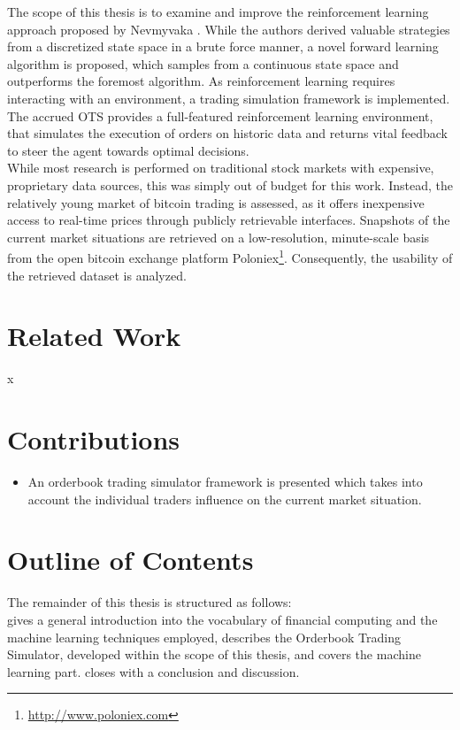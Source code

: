 The scope of this thesis is to examine and improve the reinforcement learning approach proposed by Nevmyvaka \etal\cite{Nevmyvaka:2006}. While the authors derived valuable strategies from a discretized state space in a brute force manner, a novel forward learning algorithm is proposed, which samples from a continuous state space and outperforms the foremost algorithm. As reinforcement learning requires interacting with an environment, a trading simulation framework is implemented. The accrued \acf{OTS} provides a full-featured reinforcement learning environment, that simulates the execution of orders on historic data and returns vital feedback to steer the agent towards optimal decisions.\\

While most research is performed on traditional stock markets with expensive, proprietary data sources, this was simply out of budget for this work. Instead, the relatively young market of bitcoin trading is assessed, as it offers inexpensive access to real-time prices through publicly retrievable interfaces. Snapshots of the current market situations are retrieved on a low-resolution, minute-scale basis from the open bitcoin exchange platform Poloniex\footnote{\url{http://www.poloniex.com}}. Consequently, the usability of the retrieved dataset is analyzed.

\section{Related Work}
\label{sec:relatedwork}
x

\section{Contributions}
\label{sec:contributions}
\begin{itemize}
\item An orderbook trading simulator framework is presented which takes into account the individual traders influence on the current market situation.

\end{itemize}

\section{Outline of Contents}
\label{sec:outline}
The remainder of this thesis is structured as follows:\\
 gives a general introduction into the vocabulary of financial computing and the machine learning techniques employed,  describes the Orderbook Trading  Simulator, developed within the scope of this thesis, and  covers the machine learning part.  closes with a conclusion and discussion.


\cleardoublepage{}
